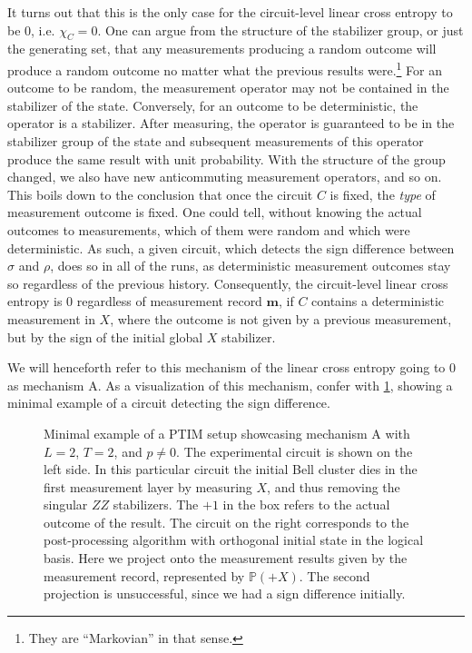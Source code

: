 It turns out that this is the only case for the circuit-level linear cross
entropy to be $0$, i.e. $\chi_C = 0$. One can argue from the structure of the
stabilizer group, or just the generating set, that any measurements producing a
random outcome will produce a random outcome no matter what the previous
results were.\footnote{They are \enquote{Markovian} in that sense.} For an
outcome to be random, the measurement operator may not be contained in the
stabilizer of the state. Conversely, for an outcome to be deterministic, the
operator is a stabilizer. After measuring, the operator is guaranteed to be in
the stabilizer group of the state and subsequent measurements of this operator
produce the same result with unit probability. With the structure of the group
changed, we also have new anticommuting measurement operators, and so on. This
boils down to the conclusion that once the circuit $C$ is fixed, the
\emph{type} of measurement outcome is fixed. One could tell, without knowing
the actual outcomes to measurements, which of them were random and which were
deterministic. As such, a given circuit, which detects the sign difference
between $\sigma$ and $\rho$, does so in all of the runs, as deterministic
measurement outcomes stay so regardless of the previous history. Consequently,
the circuit-level linear cross entropy is $0$ regardless of measurement record
$\mathbf{m}$, if $C$ contains a deterministic measurement in $X$, where the
outcome is not given by a previous measurement, but by the sign of the initial
global $X$ stabilizer.

We will henceforth refer to this mechanism of
the linear cross entropy going to $0$ as mechanism \textsf{A}. As a
visualization of this mechanism, confer with \cref{fig:mechanism-a}, showing a
minimal example of a circuit detecting the sign difference.

\begin{figure}[t]
  \centering
  
  \caption{Minimal example of a PTIM setup showcasing mechanism \textsf{A} with $L=2$, $T=2$, and $p\neq
  0$. The experimental circuit is shown on the left side.
  In this particular circuit the initial Bell cluster dies in the first measurement layer by
measuring $X$, and thus removing the singular $ZZ$ stabilizers. 
 The $+1$ in the box refers to the actual
outcome of the result.
The circuit on the right corresponds
to the post-processing algorithm with orthogonal initial state in the logical
basis. Here we project onto the measurement results given by the measurement
record, represented by $\mathbb{P}(+X)$. The second projection is unsuccessful,
since we had a sign difference initially.}
  \label{fig:mechanism-a}
\end{figure}

